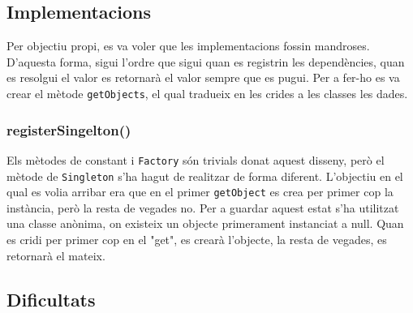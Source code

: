 \subsection{Implementacions}
Per objectiu propi, es va voler que les implementacions fossin mandroses. D'aquesta forma, sigui l'ordre que sigui quan
es registrin les dependències, quan es resolgui el valor es retornarà el valor sempre que es pugui. Per a fer-ho es va
crear el mètode \texttt{getObjects}, el qual tradueix en les crides a les classes les dades.
\subsubsection{registerSingelton()}
Els mètodes de constant i  \texttt{Factory} són trivials donat aquest disseny, però el mètode de \texttt{Singleton} s'ha
hagut de realitzar de forma diferent. L'objectiu en el qual es volia arribar era que en el primer \texttt{getObject} es
crea per primer cop la instància, però la resta de vegades no. Per a guardar aquest estat s'ha utilitzat una classe anònima,
on existeix un objecte primerament instanciat a null. Quan es cridi per primer cop en el "get", es crearà l'objecte, la resta
de vegades, es retornarà el mateix.
\subsection{Dificultats}

